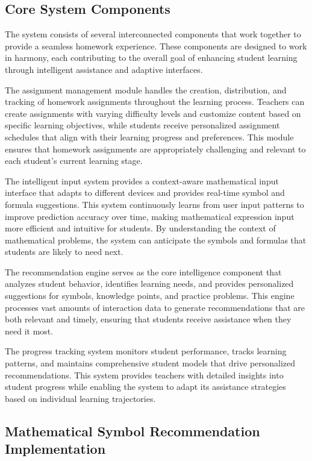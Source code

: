 \documentclass[conference]{IEEEtran}
\begin{document}
\subsection{Core System Components}

The system consists of several interconnected components that work together to provide a seamless homework experience. These components are designed to work in harmony, each contributing to the overall goal of enhancing student learning through intelligent assistance and adaptive interfaces.

The assignment management module handles the creation, distribution, and tracking of homework assignments throughout the learning process. Teachers can create assignments with varying difficulty levels and customize content based on specific learning objectives, while students receive personalized assignment schedules that align with their learning progress and preferences. This module ensures that homework assignments are appropriately challenging and relevant to each student's current learning stage.

The intelligent input system provides a context-aware mathematical input interface that adapts to different devices and provides real-time symbol and formula suggestions. This system continuously learns from user input patterns to improve prediction accuracy over time, making mathematical expression input more efficient and intuitive for students. By understanding the context of mathematical problems, the system can anticipate the symbols and formulas that students are likely to need next.

The recommendation engine serves as the core intelligence component that analyzes student behavior, identifies learning needs, and provides personalized suggestions for symbols, knowledge points, and practice problems. This engine processes vast amounts of interaction data to generate recommendations that are both relevant and timely, ensuring that students receive assistance when they need it most.

The progress tracking system monitors student performance, tracks learning patterns, and maintains comprehensive student models that drive personalized recommendations. This system provides teachers with detailed insights into student progress while enabling the system to adapt its assistance strategies based on individual learning trajectories.

\subsection{Mathematical Symbol Recommendation Implementation}
\end{document}
